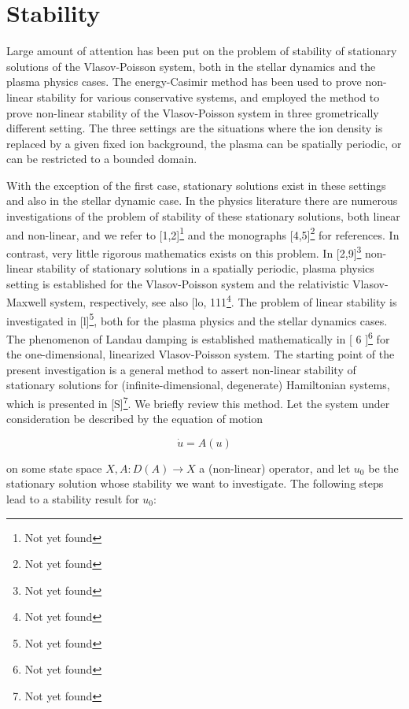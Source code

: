 \chapter{Stability}
\label{cha:stability}
Large amount of attention has been put on the problem of stability of stationary solutions of the Vlasov-Poisson system, both in the stellar dynamics and the plasma physics cases. The energy-Casimir 
method has been used to prove non-linear stability for various conservative systems, and \cite{rein_non-linear_1994} employed the method to prove non-linear stability of the Vlasov-Poisson system in three grometrically different setting. The three settings are the situations where the ion density is replaced by a given fixed ion background, the plasma can be spatially periodic, or can be restricted to a bounded domain. 


With the exception of the first case, stationary solutions exist in these settings and also in the stellar dynamic case. 
In the physics literature there are numerous investigations of the problem of stability of these stationary solutions, both linear and non-linear, and we refer to [1,2]\footnote{Not yet found} and the monographs [4,5]\footnote{Not yet found} for references. In contrast, very little rigorous mathematics exists on this problem. In [2,9]\footnote{Not yet found} non-linear stability of stationary solutions in a spatially periodic, plasma physics setting is established for the Vlasov-Poisson system and the 
relativistic Vlasov-Maxwell system, respectively, see also [lo, 111\footnote{Not yet found}. The problem of linear stability is investigated in [l]\footnote{Not yet found}, both for the plasma physics and the stellar dynamics cases. The phenomenon of Landau damping is established mathematically 
in [ 6 ]\footnote{Not yet found} for the one-dimensional, linearized Vlasov-Poisson system. 
The starting point of the present investigation is a general method to assert 
non-linear stability of stationary solutions for (infinite-dimensional, degenerate) 
Hamiltonian systems, which is presented in [S]\footnote{Not yet found}. We briefly review this method. Let the 
system under consideration be described by the equation of motion 

$$\dot{u} = A(u)$$

on some state space $X , A : D(A) \rightarrow X $ a (non-linear) operator, and let $u_0$ be the 
stationary solution whose stability we want to investigate. The following steps lead to 
a stability result for $u_0$:

